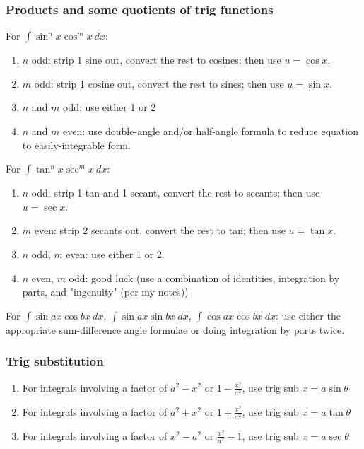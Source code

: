 \documentclass[main.tex]{subfiles}
\begin{document}
\begin{multicols}{2}
	\subsubsection*{Products and some quotients of trig functions}
	For \(\displaystyle \int \sin^n{x} \cos^m{x} \ dx\):
	\begin{enumerate}
	\item \(n\) odd: strip 1 sine out, convert the rest to cosines; then use \(u = \cos{x}\).
	\item \(m\) odd: strip 1 cosine out, convert the rest to sines; then use \(u = \sin{x}\).
	\item \(n\) and \(m\) odd: use either 1 or 2
	\item \(n\) and \(m\) even: use double-angle and/or half-angle formula to reduce equation to easily-integrable form.
	\end{enumerate}

	For \(\displaystyle \int \tan^n{x} \sec^m{x} \ dx\):
	\begin{enumerate}
	\item \(n\) odd: strip 1 tan and 1 secant, convert the rest to secants; then use \(u = \sec{x}\).
	\item \(m\) even: strip 2 secants out, convert the rest to tan; then use \(u = \tan{x}\).
	\item \(n\) odd, \(m\) even: use either 1 or 2.
	\item \(n\) even, \(m\) odd: good luck (use a combination of identities, integration by parts, and "ingenuity" (per my notes))
	\end{enumerate}

	For \(\displaystyle \int \sin{ax} \cos{bx} \ dx\), \(\displaystyle \int \sin{ax} \sin{bx} \ dx\), \(\displaystyle \int \cos{ax} \cos{bx} \ dx\): use either the appropriate sum-difference angle formulae or doing integration by parts twice.

	\subsubsection*{Trig substitution}
	\begin{enumerate}
		\item For integrals involving a factor of \(a^2 - x^2\) or \(1 - \frac{x^2}{a^2}\), use trig sub \(x = a \sin{\theta}\)
		\item For integrals involving a factor of \(a^2 + x^2\) or \(1 + \frac{x^2}{a^2}\), use trig sub \(x = a \tan{\theta}\)
		\item For integrals involving a factor of \(x^2 - a^2\) or \(\frac{x^2}{a^2} - 1\), use trig sub \(x = a \sec{\theta}\)
	\end{enumerate}
	

\end{multicols}
\end{document}
